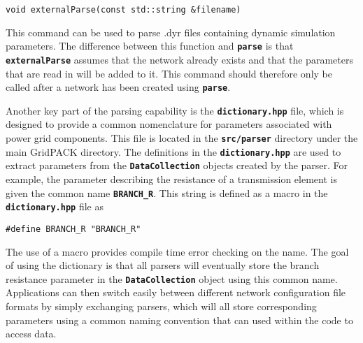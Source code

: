 {
\color{red}
\begin{Verbatim}[fontseries=b]
void externalParse(const std::string &filename)
\end{Verbatim}
}

This command can be used to parse .dyr files containing dynamic simulation parameters. The difference between this function and \texttt{\textbf{parse}} is that \texttt{\textbf{externalParse}} assumes that the network already exists and that the parameters that are read in will be added to it. This command should therefore only be called after a network has been created using \texttt{\textbf{parse}}.

Another key part of the parsing capability is the \texttt{\textbf{dictionary.hpp}} file, which is designed to provide a common nomenclature for parameters associated with power grid components. This file is located in the \texttt{\textbf{src/parser}} directory under the main GridPACK directory. The definitions in the \texttt{\textbf{dictionary.hpp}} are used to extract parameters from the \texttt{\textbf{DataCollection}} objects created by the parser. For example, the parameter describing the resistance of a transmission element is given the common name \texttt{\textbf{BRANCH\_R}}. This string is defined as a macro in the \texttt{\textbf{dictionary.hpp}} file as

{
\color{red}
\begin{Verbatim}[fontseries=b]
#define BRANCH_R "BRANCH_R"
\end{Verbatim}
}

The use of a macro provides compile time error checking on the name. The goal of using the dictionary is that all parsers will eventually store the branch resistance parameter in the \texttt{\textbf{DataCollection}} object using this common name. Applications can then switch easily between different network configuration file formats by simply exchanging parsers, which will all store corresponding parameters using a common naming convention that can used within the code to access data.
